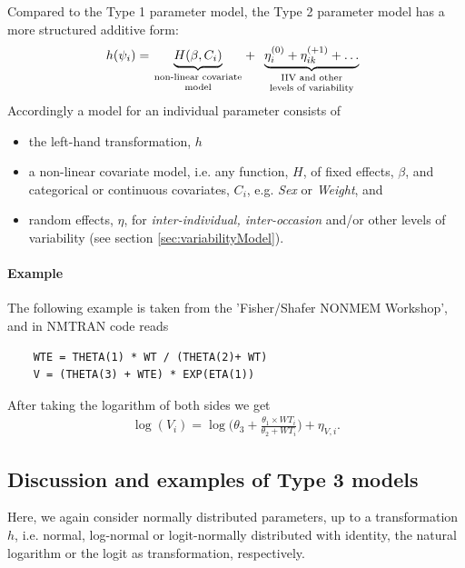 Compared to the Type 1 parameter model, the Type 2 parameter model has a more structured additive form:
\begin{align*}
h(\psi_i) =
\underbrace{H(\beta, C_i)}_{\text{\parbox{2.5cm}{\centering non-linear covariate\\[-4pt] model}}}
+ \underbrace{\eta_i^{(0)}+ \eta_{ik}^{(+1)} + \dots}_{\text{\parbox{3cm}{\centering IIV and other\\[-4pt] levels of variability}}}
\end{align*}
Accordingly a model for an individual parameter consists of
\begin{itemize}
\item
the left-hand transformation, $h$
\item
a non-linear covariate model, i.e. any function, $H$, of fixed effects, $\beta$, and categorical or continuous covariates, $C_i$, e.g. \textit{Sex} or \textit{Weight}, and
\item
random effects, $\eta$, for \textit{inter-individual, inter-occasion} and/or other levels of variability (see section \ref{sec:variabilityModel}).
\end{itemize}

\paragraph{Example}
The following example is taken from the 'Fisher/Shafer NONMEM Workshop', and in NMTRAN code reads
\lstset{language=NONMEMdataSet}
\begin{lstlisting}
	WTE = THETA(1) * WT / (THETA(2)+ WT)
	V = (THETA(3) + WTE) * EXP(ETA(1))
\end{lstlisting}

After taking the logarithm of both sides we get
\begin{align*}
\log(V_i) = \log\Big(\theta_3 + \frac{\theta_1 \times WT_i}{\theta_2 + WT_i}\Big) + \eta_{V,i}.
\end{align*}

\subsection{Discussion and examples of Type 3 models}
\label{subsec:paramModelType3}
Here, we again consider normally distributed parameters, up to a transformation $h$, i.e. normal, log-normal or logit-normally distributed with identity, the natural logarithm or the logit as transformation, respectively.

